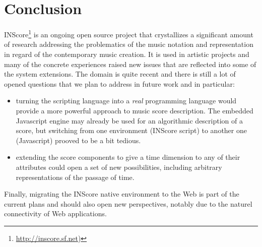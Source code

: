 \documentclass[11pt,a4paper]{article}
\begin{document}
\section{Conclusion}

INScore\footnote{\url{http://inscore.sf.net})} is an ongoing open source project 
that crystallizes a significant amount of research addressing the problematics of the music notation and representation in regard of the contemporary music creation. It is used in artistic projects and many of the concrete experiences raised new issues that are reflected into some of the system extensions. The domain is quite recent and there is still a lot of opened questions that we plan to address in future work and in particular: 
\begin{itemize}
\item turning the scripting language into a \emph{real} programming language would provide a more powerful approach to music score description. The embedded Javascript engine may already be used for an algorithmic description of a score, but switching from one environment (INScore script) to another one (Javascript) prooved to be a bit tedious.
\item extending the score components to give a time dimension to any of their attributes could open a set of new possibilities, including arbitrary representations of the passage of time.
\end{itemize}
Finally, migrating the INScore native environment to the Web is part of the current plans and should also open new perspectives, notably due to the naturel connectivity of Web applications.


\balance


\end{document}
